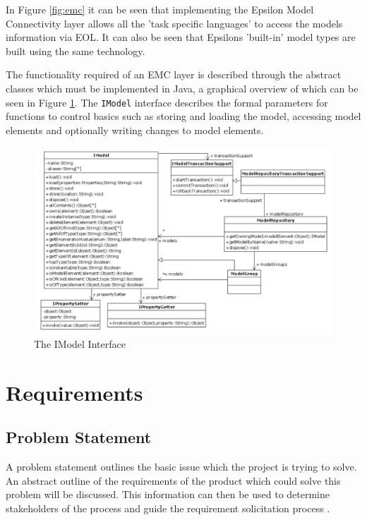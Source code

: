\documentclass[11pt]{book}
\newcommand{\code}[1]{\texttt{#1}}
\begin{document}
In Figure \ref{fig:emc} it can be seen that implementing the Epsilon Model Connectivity layer allows all the 'task specific languages' to access the models information via EOL. It can also be seen that Epsilons 'built-in' model types are built using the same technology.

The functionality required of an EMC layer is described through the abstract classes which must be implemented in Java, a graphical overview of which can be seen in Figure \ref{fig:imodelinterface}. The \code{IModel} interface describes the formal parameters for functions to control basics such as storing and loading the model, accessing model elements and optionally writing changes to model elements.

\begin{figure}[H]
	\centering
	\includegraphics[width=\textwidth]{images/imodel-interface}
	\caption{The IModel Interface \cite{theepsilonbook}}
	\label{fig:imodelinterface}
\end{figure}

\chapter{Requirements}
\label{requirements}

\section{Problem Statement}
\label{problemstatement}
A problem statement outlines the basic issue which the project is trying to solve. An abstract outline of the requirements of the product which could solve this problem will be discussed. This information can then be used to determine stakeholders of the process and guide the requirement solicitation process \cite{problemstatement}.
\end{document}
